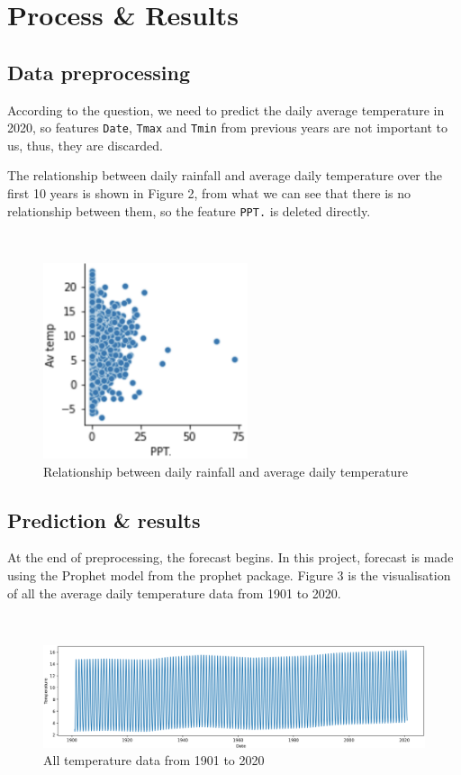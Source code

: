 \documentclass{article}
\begin{document}
\newpage

\section{Process \& Results}

\subsection{Data preprocessing}

According to the question, we need to predict the daily average temperature in 2020, so features \verb|Date|, \verb|Tmax| and \verb|Tmin| from previous years are not important to us, thus, they are discarded.

The relationship between daily rainfall and average daily temperature over the first 10 years is shown in Figure 2, from what we can see that there is no relationship between them, so the feature \verb|PPT.| is deleted directly.

\

\begin{figure}[htbp]
\centering
\includegraphics[width=6cm]{rela.png} %
\caption{Relationship between daily rainfall and average daily temperature} %
\end{figure}


\subsection{Prediction \& results}

At the end of preprocessing, the forecast begins. In this project, forecast is made using the Prophet model from the prophet package. Figure 3 is the visualisation of all the average daily temperature data from 1901 to 2020.

\

\begin{figure}[htbp]
\centering
\includegraphics[width=15cm]{wholeyears.png} %
\caption{All temperature data from 1901 to 2020} %
\end{figure}
\end{document}
